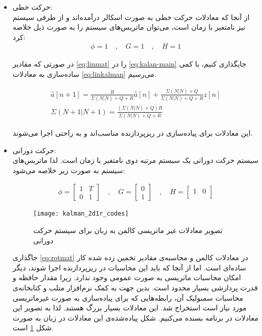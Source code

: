 \begin{itemize}
	\item حرکت خطی: \\
از آنجا که معادلات حرکت خطی به صورت اسکالر درآمده‌اند و از طرفی سیستم نیز نامتغیر با زمان است، می‌توان ماتریس‌های سیستم را به صورت ذیل خلاصه کرد:
\begin{gather}
	\phi = 1 \quad,\quad G = 1\quad,\quad H = 1 \label{eq:linmat}
\end{gather}

\newpage
در صورتی که مقادیر \ref{eq:linmat} را در \ref{eq:kalan-main} جایگذاری کنیم، با کمی ساده‌سازی به معادلات \ref{eq:linkalman} می‌رسیم.

\begin{gather}
	\hat{a}[n+1] = \frac{R}{\Sigma(N|N)+Q+R} \hat{a}[n] + \frac{\Sigma(N|N)+Q}{\Sigma(N|N)+Q+R}z[n] \nonumber \\
	\Sigma(N+1|N+1) = \frac{(\Sigma(N|N)+Q)R}{\Sigma(N|N)+Q+R} \label{eq:linkalman}
\end{gather}

این معادلات برای پیاده‌سازی در ریزپردازنده مناسب‌اند و به راحتی اجرا می‌شوند.

	\item  حرکت دورانی: \\
سیستم حرکت دورانی یک سیستم مرتبه دوی نامتغیر با زمان است. لذا ماتریس‌های سیستم به صورت زیر خلاصه می‌شود:

\begin{gather}
	\phi = 
	\begin{bmatrix}
		1 & T \\
		0 & 1
	\end{bmatrix}
	\quad , \quad
	G = 
	\begin{bmatrix}
		0 \\
		1
	\end{bmatrix}
	\quad,\quad
	H = 
	\begin{bmatrix}
		1 & 0 \\
	\end{bmatrix}
	\label{eq:rotmat}
\end{gather}

\begin{figure}[h]
	\centering
	\texttt{[image: kalman\_2d1r\_codes]}
	\caption{تصویر معادلات غیر ماتریسی کالمن به زبان  برای سیستم حرکت دورانی}
	\label{fig:kalman-2d1r-code}
\end{figure}

جاگذاری \ref{eq:rotmat} در معادلات کالمن و محاسبه‌ی مقادیر تخمین زده شده کار ساده‌ای است. اما از آنجا که باید این محاسبات در ریزپردازنده اجرا شوند، دیگر امکان محاسبات ماتریسی به صورت عمومی وجود ندارد. زیرا مقدار حافظه و قدرت پردازشی بسیار محدود است. بدین جهت به کمک نرم‌افزار متلب و کتابخانه‌ی محاسبات سمبولیک آن، رابطه‌هایی که برای پیاده‌سازی به صورت غیرماتریسی مورد نیاز است استخراج شد. این معادلات بسیار بزرگ هستند. لذا به تصویر این معادلات در برنامه بسنده می‌کنیم. شکل پیاده‌شده‌ی این معادلات در زبان  به صورت شکل \ref{fig:kalman-2d1r-code} است.
\end{itemize}

